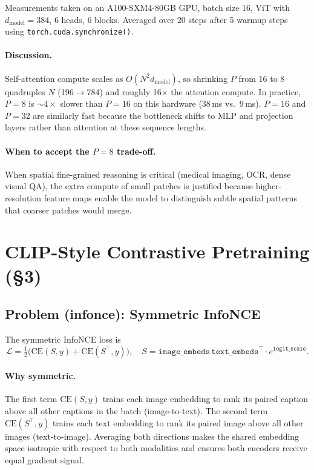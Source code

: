 \documentclass[11pt]{article}
\begin{document}
Measurements taken on an A100-SXM4-80GB GPU, batch size 16, ViT with $d_{\mathrm{model}}=384$, 6 heads, 6 blocks. Averaged over 20 steps after 5 warmup steps using \texttt{torch.cuda.synchronize()}.

\paragraph{Discussion.}
Self-attention compute scales as $O(N^2 d_{\mathrm{model}})$, so shrinking $P$ from 16 to 8 quadruples $N$ (196$\to$784) and roughly 16$\times$ the attention compute. In practice, $P{=}8$ is ${\sim}4\times$ slower than $P{=}16$ on this hardware (38\,ms vs.\ 9\,ms). $P{=}16$ and $P{=}32$ are similarly fast because the bottleneck shifts to MLP and projection layers rather than attention at these sequence lengths.

\paragraph{When to accept the $P{=}8$ trade-off.}
When spatial fine-grained reasoning is critical (medical imaging, OCR, dense visual QA), the extra compute of small patches is justified because higher-resolution feature maps enable the model to distinguish subtle spatial patterns that coarser patches would merge.

\section{CLIP-Style Contrastive Pretraining (\S3)}

\subsection*{Problem (infonce): Symmetric InfoNCE}

The symmetric InfoNCE loss is
\[
\mathcal{L} = \tfrac{1}{2}\bigl(\mathrm{CE}(S, y) + \mathrm{CE}(S^\top, y)\bigr),
\quad S = \texttt{image\_embeds}\,\texttt{text\_embeds}^\top \cdot e^{\texttt{logit\_scale}}.
\]

\paragraph{Why symmetric.}
The first term $\mathrm{CE}(S, y)$ trains each image embedding to rank its paired caption above all other captions in the batch (image-to-text). The second term $\mathrm{CE}(S^\top, y)$ trains each text embedding to rank its paired image above all other images (text-to-image). Averaging both directions makes the shared embedding space isotropic with respect to both modalities and ensures both encoders receive equal gradient signal.
\end{document}
